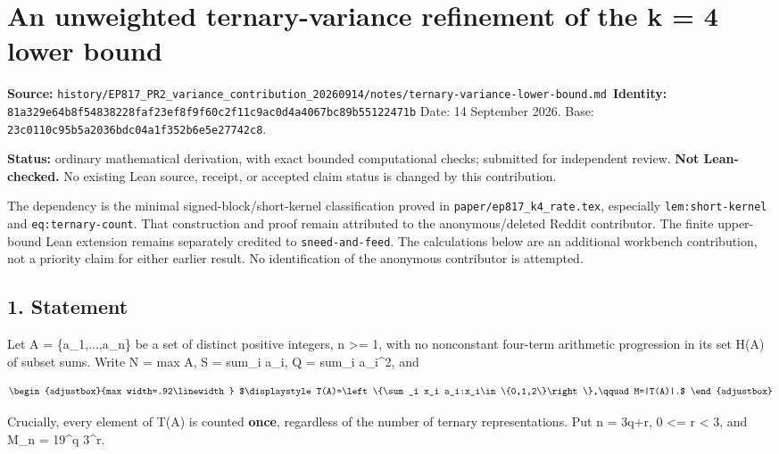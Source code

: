 \chapter{An unweighted ternary-variance refinement of the k = 4 lower bound}
\label{chapter:01_ternary-variance-lower-bound}
{\small\noindent\textbf{Source:} \nolinkurl{history/EP817_PR2_variance_contribution_20260914/notes/ternary-variance-lower-bound.md}\
\textbf{Identity:} \nolinkurl{81a329e64b8f54838228faf23ef8f9f60c2f11c9ac0d4a4067bc89b55122471b}}
\medskip
Date: 14 September 2026. Base: \nolinkurl{23c0110c95b5a2036bdc04a1f352b6e5e27742c8}.

\textbf{Status:} ordinary mathematical derivation, with exact bounded computational checks; submitted for independent review. \textbf{Not Lean-checked.} No existing Lean source, receipt, or accepted claim status is changed by this contribution.

The dependency is the minimal signed-block/short-kernel classification proved in \texttt{paper/ep817\_k4\_rate.tex}, especially \texttt{lem:short-kernel} and \texttt{eq:ternary-count}. That construction and proof remain attributed to the anonymous/deleted Reddit contributor. The finite upper-bound Lean extension remains separately credited to \texttt{sneed-and-feed}. The calculations below are an additional workbench contribution, not a priority claim for either earlier result. No identification of the anonymous contributor is attempted.

\section{1. Statement}\label{n01-statement}

Let A = \{a\_1,...,a\_n\} be a set of distinct positive integers, n \textgreater= 1, with no nonconstant four-term arithmetic progression in its set H(A) of subset sums. Write N = max A, S = sum\_i a\_i, Q = sum\_i a\_i\^{}2, and

\[
\begin{adjustbox}{max width=.92\linewidth}
$\displaystyle T(A)=\left\{\sum_i x_i a_i:x_i\in\{0,1,2\}\right\},\qquad M=|T(A)|.$
\end{adjustbox}
\]

Crucially, every element of T(A) is counted \textbf{once}, regardless of the number of ternary representations. Put n = 3q+r, 0 \textless= r \textless{} 3, and M\_n = 19\^{}q 3\^{}r.

